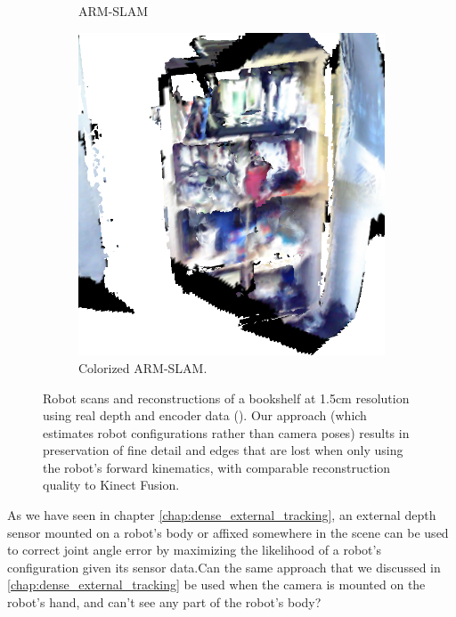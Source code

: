 \begin{figure}[width=0.5\columnwidth, ht]
\begin{subfigure}{0.29\columnwidth}
	\caption{ARM-SLAM}
	\end{subfigure}
	  \begin{subfigure}{0.29\columnwidth}
	 \centering
	 \includegraphics[width=1.0\textwidth]{img/arm_slam/better_bookshelf.png}
	 \caption{Colorized ARM-SLAM.}
	 \end{subfigure} 
	\caption{Robot scans and reconstructions of a bookshelf at 1.5cm resolution using real depth and encoder data (). Our approach (which estimates robot configurations rather than camera poses) results in preservation of fine detail and edges that are lost when only using the robot's forward kinematics, with comparable reconstruction quality to Kinect Fusion.}
	\label{fig:real_reconstructions}
\end{figure}

As we have seen in chapter \ref{chap:dense_external_tracking}, an external depth sensor mounted on a robot's body or affixed somewhere in the scene can be used to correct joint angle error by maximizing the likelihood of a robot's configuration given its sensor data.Can the same approach that we discussed in \ref{chap:dense_external_tracking} be used when the camera is mounted on the robot's hand, and can't see any part of the robot's body? 

